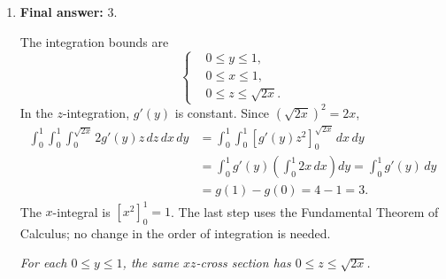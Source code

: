 \documentclass[12pt]{exam}
\begin{document}
\begin{enumerate}
\begin{center}
\begin{minipage}[t]{0.46\linewidth}
\textit{Reversed: horizontal slices split at $y=1$.}
\end{minipage}
\end{center}
An equivalent answer is $\displaystyle
\int_0^2\int_0^{\min\{y,2-y\}}h(x,y)\,dx\,dy$;
the upper bound can also be written $1-|y-1|$.

\item \textbf{Final answer:} $\boxed{3}$.

The integration bounds are
\[
  \left\{
  \begin{aligned}
    &0\leq y\leq1,\\
    &0\leq x\leq1,\\
    &0\leq z\leq\sqrt{2x}.
  \end{aligned}
  \right.
\]
In the $z$-integration, $g'(y)$ is constant. Since $(\sqrt{2x})^2=2x$,
\[
\begin{aligned}
  \int_0^1\int_0^1\int_0^{\sqrt{2x}}2g'(y)z\,dz\,dx\,dy
  &=\int_0^1\int_0^1\left[g'(y)z^2\right]_0^{\sqrt{2x}}\,dx\,dy\\
  &=\int_0^1 g'(y)\left(\int_0^1 2x\,dx\right)dy
    =\int_0^1 g'(y)\,dy\\
  &=g(1)-g(0)=4-1=\boxed{3}.
\end{aligned}
\]
The $x$-integral is $[x^2]_0^1=1$. The last step uses the Fundamental
Theorem of Calculus; no change in the order of integration is needed.

\begin{center}

\textit{For each $0\leq y\leq1$, the same $xz$-cross section has
$0\leq z\leq\sqrt{2x}$.}
\end{center}

\end{enumerate}
\end{document}
